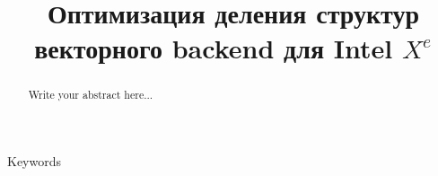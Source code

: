 \documentclass[conference,letterpaper]{IEEEtran}
\begin{document}

\title{Оптимизация деления структур векторного backend для Intel $X^e$\\
}
\author{
}
\maketitle
\begin{abstract}
Write your abstract here...

\end{abstract}

\begin{IEEEkeywords}
Keywords
\end{IEEEkeywords}





\end{document}
